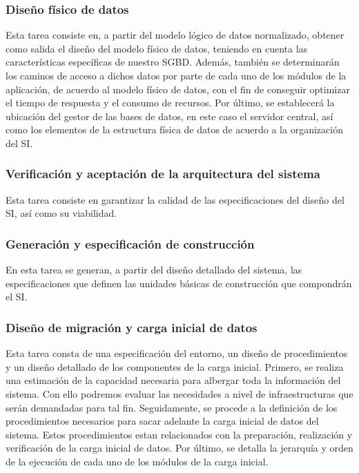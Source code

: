 \documentclass[11pt,a4paper,spanish,twoside]{book}
\begin{document}
\subsubsection{Diseño físico de datos}
Esta tarea consiste en, a partir del modelo lógico de datos normalizado, 
obtener como salida el diseño del modelo físico de datos, teniendo en cuenta 
las características específicas de nuestro SGBD. Además, también se 
determinarán los caminos de acceso a dichos datos por parte de cada uno de los 
módulos de la aplicación, de acuerdo al modelo físico de datos, con el fin de 
conseguir optimizar el tiempo de respuesta y el consumo de recursos. Por 
último, se establecerá la ubicación del gestor de las bases de datos, en este
caso el servidor central, así como los elementos de la estructura física de 
datos de acuerdo a la organización del SI.

\subsubsection{Verificación y aceptación de la arquitectura del sistema}
Esta tarea consiste en garantizar la calidad de las especificaciones del diseño
del SI, así como su viabilidad.

\subsubsection{Generación y especificación de construcción}
En esta tarea se generan, a partir del diseño detallado del sistema, las 
especificaciones que definen las unidades básicas de construcción que 
compondrán el SI.

\subsubsection{Diseño de migración y carga inicial de datos}
Esta tarea consta de una especificación del entorno, un diseño de 
procedimientos y un diseño detallado de los componentes de la carga inicial. 
Primero, se realiza una estimación de la capacidad necesaria para albergar 
toda la información del sistema. Con ello podremos evaluar las necesidades a 
nivel de infraestructuras que serán demandadas para tal fin. Seguidamente, se 
procede a la definición de los procedimientos necesarios para sacar adelante 
la carga inicial de datos del sistema. Estos procedimientos estan relacionados 
con la preparación, realización y verificación de la carga inicial de datos. 
Por último, se detalla la jerarquía y orden de la ejecución de cada uno de los 
módulos de la carga inicial.
\end{document}
